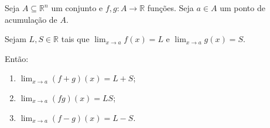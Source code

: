\begin{proposition}
    Seja $A\subseteq \mathbb R^n$ um conjunto e $f, g: A \to \mathbb R$ funções.
    Seja $a \in A$ um ponto de acumulação de $A$.

    Sejam $L, S \in \mathbb R$ tais que $\lim_{x\to a} f(x) = L$ e $\lim_{x\to a} g(x) = S$.

    Então:

    \begin{enumerate}[label=(\alph*)]
        \item $\lim_{x\to a} (f+g)(x) = L + S$;
        \item $\lim_{x\to a} (fg)(x) = LS$;
        \item $\lim_{x\to a} (f-g)(x) = L - S$.
    \end{enumerate}
\end{proposition}
